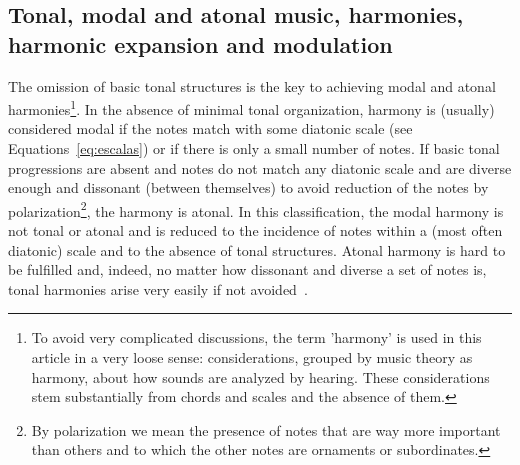 \subsection{Tonal, modal and atonal music, harmonies, harmonic expansion and modulation}\label{subsec:harmonia}
The omission of basic tonal structures is the key to achieving modal and atonal harmonies\footnote{To avoid very complicated discussions,
the term 'harmony' is used in this article in a very loose sense:
considerations, grouped by music theory as harmony, about how sounds are analyzed by hearing.
These considerations stem substantially from chords and scales and the absence of them.}. In the absence of minimal tonal organization,
harmony is (usually) considered modal if the notes match with some diatonic scale (see Equations~\ref{eq:escalas}) or if there is only a small number of notes. If basic tonal progressions are absent and notes do not match any diatonic scale and are diverse enough and dissonant (between themselves) to avoid reduction of the notes by polarization\footnote{By polarization we mean the presence of notes that are way more important than others and to which the other notes are ornaments or subordinates.}, the harmony is atonal. In this classification, the modal harmony is not tonal or atonal and is reduced to the incidence of notes within a (most often diatonic) scale and to the absence of tonal structures.
Atonal harmony is hard to be fulfilled and, indeed, no matter how dissonant and diverse
a set of notes is, tonal harmonies arise very easily if not avoided~\cite{harmEXT}.

